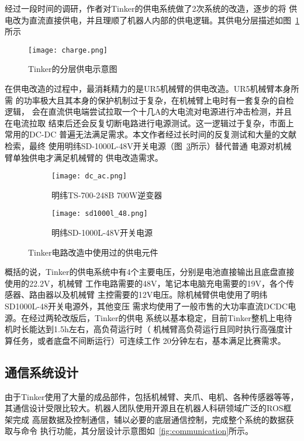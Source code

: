 经过一段时间的调研，作者对Tinker的供电系统做了2次系统的改造，逐步的将
供电改为直流直接供电，并且理顺了机器人内部的供电逻辑。其供电分层描述如图~\ref{fig:charge}
所示

\begin{figure}[ht] %
  \centering
  \texttt{[image: charge.png]}
  \caption{Tinker的分层供电示意图}
  \label{fig:charge}
\end{figure}

在供电改造的过程中，最消耗精力的是UR5机械臂的供电改造。UR5机械臂本身所需
的功率极大且其本身的保护机制过于复杂，在机械臂上电时有一套复杂的自检逻辑，
会在直流供电端尝试拉取一个十几A的大电流对电源进行冲击检测，并且在电流拉取
结束后还会反复切断电路进行电源测试。这一逻辑过于复杂，市面上常用的DC-DC
普遍无法满足需求。本文作者经过长时间的反复测试和大量的文献检索，最终
使用明纬SD-1000L-48V开关电源（图~\ref{fig:sd1000l_48}所示）替代普通
电源对机械臂单独供电才满足机械臂的
供电改造需求。

\begin{figure}
\centering
\begin{subfigure}{.5\textwidth}
  \centering
  \texttt{[image: dc\_ac.png]}
  \caption{明纬TS-700-248B 700W逆变器}
  \label{fig:dc_ac}
\end{subfigure}%
\begin{subfigure}{.5\textwidth}
  \centering
  \texttt{[image: sd1000l\_48.png]}
  \caption{明纬SD-1000L-48V开关电源}
  \label{fig:sd1000l_48}
\end{subfigure}
\caption{Tinker电路改造中使用过的供电元件}
\label{fig:charge_hareware}
\end{figure}

概括的说，Tinker的供电系统中有4个主要电压，分别是电池直接输出且底盘直接
使用的22.2V，机械臂
工作电路需要的48V，笔记本电脑充电需要的19V，各个传感器、路由器以及机械臂
主控需要的12V电压。除机械臂供电使用了明纬SD1000L-48开关电源外，其他变压
需求均使用了一般市售的大功率直流DCDC电源。在经过两轮改版后，Tinker的供电
系统以基本稳定，目前Tinker整机上电待机时长能达到1.5h左右，高负荷运行时（
机械臂高负荷运行且同时执行高强度计算任务，或者底盘不间断运行）可连续工作
20分钟左右，基本满足比赛需求。

\subsection{通信系统设计}

由于Tinker使用了大量的成品部件，包括机械臂、夹爪、电机、各种传感器等等，
其通信设计受限比较大。机器人团队使用开源且在机器人科研领域广泛的ROS框架完成
高层数据及控制通信，辅以必要的底层通信控制，完成整个系统的数据获取与命令
执行功能，其分层设计示意图如~\ref{fig:communication}所示。


